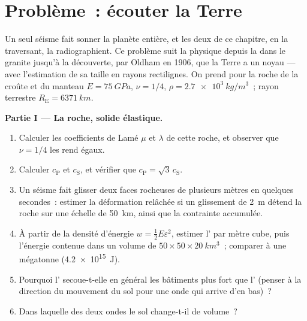 \section{Problème~: écouter la Terre}

\begin{problem}\label{pb:b3:continuum-elasticity:1}
Un seul séisme fait sonner la planète entière, et les deux  de ce chapitre, en la traversant, la radiographient. Ce
problème suit la physique depuis la  dans le granite
jusqu'à la découverte, par Oldham en 1906, que la Terre a un noyau ---
avec l'estimation de sa taille en rayons rectilignes. On prend pour la
roche de la croûte et du manteau $E = \qty{75}{GPa}$, $\nu = 1/4$,
$\rho = \qty{2.7e3}{kg/m^3}$~; rayon terrestre $R_{\text{E}} =
\qty{6371}{km}$.

\medskip\noindent\textbf{Partie I --- La roche, solide élastique.}
\begin{enumerate}
  \item Calculer les coefficients de Lamé $\mu$ et $\lambda$ de cette
        roche, et observer que $\nu = 1/4$ les rend égaux.
  \item Calculer $c_{\text{P}}$ et $c_{\text{S}}$, et vérifier que
        $c_{\text{P}} = \sqrt3\,c_{\text{S}}$.
  \item Un séisme fait glisser deux faces rocheuses de plusieurs mètres
        en quelques secondes~: estimer la déformation relâchée si un
        glissement de \qty{2}{m} détend la roche sur une échelle de
        \qty{50}{km}, ainsi que la contrainte accumulée.
  \item À partir de la densité d'énergie $w = \tfrac12 E\varepsilon^2$,
        estimer l' par mètre cube, puis l'énergie
        contenue dans un volume de $50 \times 50 \times \qty{20}{km^3}$~;
        comparer à une mégatonne (\qty{4.2e15}{J}).
  \item Pourquoi l' secoue-t-elle en général les bâtiments plus
        fort que l' (penser à la direction du mouvement du sol
        pour une onde qui arrive d'en bas)~?
  \item Dans laquelle des deux ondes le sol change-t-il de volume~?
\end{enumerate}


\end{problem}
